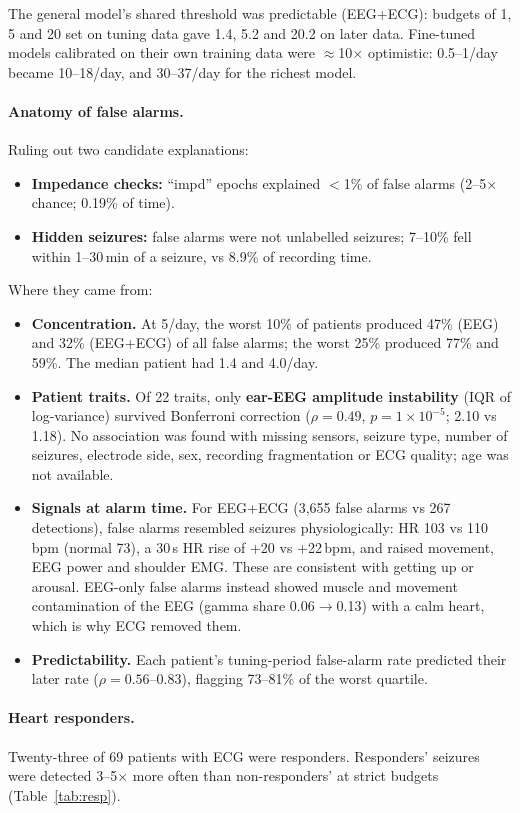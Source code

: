 The general model's shared threshold was predictable (EEG+ECG): budgets of 1, 5 and 20 \FAd{} set on tuning data gave 1.4, 5.2 and 20.2 \FAd{} on later data. Fine-tuned models calibrated on their own training data were $\approx$10$\times$ optimistic: 0.5--1/day became 10--18/day, and 30--37/day for the richest model.

\paragraph{Anatomy of false alarms.} Ruling out two candidate explanations:
\begin{itemize}
\item \textbf{Impedance checks:} ``impd'' epochs explained $<$1\% of false alarms (2--5$\times$ chance; 0.19\% of time).
\item \textbf{Hidden seizures:} false alarms were not unlabelled seizures; 7--10\% fell within 1--30\,min of a seizure, vs 8.9\% of recording time.
\end{itemize}
Where they came from:
\begin{itemize}
\item \textbf{Concentration.} At 5/day, the worst 10\% of patients produced 47\% (EEG) and 32\% (EEG+ECG) of all false alarms; the worst 25\% produced 77\% and 59\%. The median patient had 1.4 and 4.0/day.
\item \textbf{Patient traits.} Of 22 traits, only \textbf{ear-EEG amplitude instability} (IQR of log-variance) survived Bonferroni correction ($\rho=0.49$, $p=1\times10^{-5}$; 2.10 vs 1.18). No association was found with missing sensors, seizure type, number of seizures, electrode side, sex, recording fragmentation or ECG quality; age was not available.
\item \textbf{Signals at alarm time.} For EEG+ECG (3,655 false alarms vs 267 detections), false alarms resembled seizures physiologically: HR 103 vs 110\,bpm (normal 73), a 30\,s HR rise of +20 vs +22\,bpm, and raised movement, EEG power and shoulder EMG. These are consistent with getting up or arousal. EEG-only false alarms instead showed muscle and movement contamination of the EEG (gamma share 0.06$\to$0.13) with a calm heart, which is why ECG removed them.
\item \textbf{Predictability.} Each patient's tuning-period false-alarm rate predicted their later rate ($\rho=0.56$--0.83), flagging 73--81\% of the worst quartile.
\end{itemize}

\paragraph{Heart responders.} Twenty-three of 69 patients with ECG were responders. Responders' seizures were detected 3--5$\times$ more often than non-responders' at strict budgets (Table~\ref{tab:resp}).

